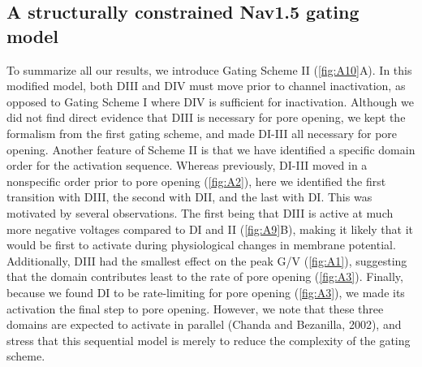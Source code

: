 \subsection{A structurally constrained Nav1.5 gating model}
To summarize all our results, we introduce Gating Scheme II (\autoref{fig:A10}A). In this modified model, both DIII and DIV must move prior to channel inactivation, as opposed to Gating Scheme I where DIV is sufficient for inactivation. Although we did not find direct evidence that DIII is necessary for pore opening, we kept the formalism from the first gating scheme, and made DI-III all necessary for pore opening. Another feature of Scheme II is that we have identified a specific domain order for the activation sequence. Whereas previously, DI-III moved in a nonspecific order prior to pore opening (\autoref{fig:A2}), here we identified the first transition with DIII, the second with DII, and the last with DI. This was motivated by several observations. The first being that DIII is active at much more negative voltages compared to DI and II (\autoref{fig:A9}B), making it likely that it would be first to activate during physiological changes in membrane potential. Additionally, DIII had the smallest effect on the peak G/V (\autoref{fig:A1}), suggesting that the domain contributes least to the rate of pore opening (\autoref{fig:A3}). Finally, because we found DI to be rate-limiting for pore opening (\autoref{fig:A3}), we made its activation the final step to pore opening. However, we note that these three domains are expected to activate in parallel (Chanda and Bezanilla, 2002), and stress that this sequential model is merely to reduce the complexity of the gating scheme. 

